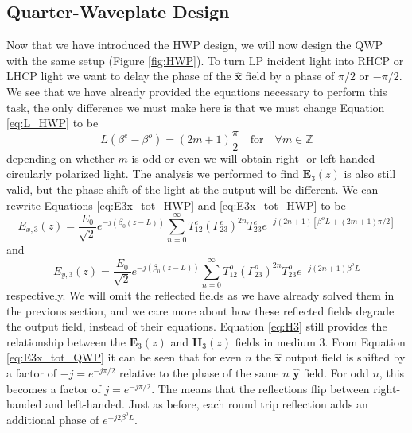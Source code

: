 \documentclass{optica-article}
\newcommand{\bv}[1]{\mathbf{#1}}
\begin{document}
\subsection{Quarter-Waveplate Design}
Now that we have introduced the HWP design, we will now design the QWP with
the same setup (Figure \ref{fig:HWP}). To turn LP incident light into RHCP or
LHCP light we want to delay the phase of the $\bv{\hat{x}}$ field by a phase of
$\pi/2$ or $-\pi/2$. We see that we have already provided the equations
necessary to perform this task, the only difference we must make here is that
we must change Equation \eqref{eq:L_HWP} to be
\begin{equation}\label{eq:L_QWP}
  L(\beta^e-\beta^o) = (2m+1)\frac{\pi}{2}
  \quad\mathrm{for}\quad
  \forall m \in \mathbb{Z}
\end{equation}
depending on whether $m$ is odd or even we will obtain right- or left-handed
circularly polarized light. The analysis we performed to find $\bv{E}_3(z)$ is 
also still valid, but the phase shift of the light at the output will be
different. We can rewrite Equations \eqref{eq:E3x_tot_HWP} and 
\eqref{eq:E3x_tot_HWP} to be
\begin{equation}\label{eq:E3x_tot_QWP}
  E_{x,3}(z) = \frac{E_0}{\sqrt{2}}e^{-j(\beta_0(z-L))}\sum_{n=0}^\infty 
  T_{12}^e \left(\Gamma_{23}^e\right)^{2n}T_{23}^e
  e^{-j(2n+1)\left[\beta^oL + (2m+1)\pi/2\right]}
\end{equation}
and
\begin{equation}\label{eq:E3y_tot_QWP}
  E_{y,3}(z) = \frac{E_0}{\sqrt{2}}e^{-j(\beta_0(z-L))}\sum_{n=0}^\infty 
  T_{12}^o \left(\Gamma_{23}^o\right)^{2n}T_{23}^o
  e^{-j(2n+1)\beta^oL}
\end{equation}
respectively.  We will omit the reflected fields as we have already solved them
in the previous section, and we care more about how these reflected fields
degrade the output field, instead of their equations. 
Equation \eqref{eq:H3} still provides the relationship between the
$\bv{E}_3(z)$ and $\bv{H}_3(z)$ fields in medium 3. From Equation 
\eqref{eq:E3x_tot_QWP} it can be seen that for even $n$ the $\bv{\hat{x}}$
output field is shifted by a factor of $-j = e^{-j\pi/2}$ relative to the
phase of the same $n$ $\bv{\hat{y}}$ field. For odd $n$, this becomes a factor
of $j = e^{-j\pi/2}$. The means that the reflections flip between right-handed 
and left-handed. Just as before, each round trip reflection adds an additional
phase of $e^{-j2\beta^oL}$.
\end{document}
